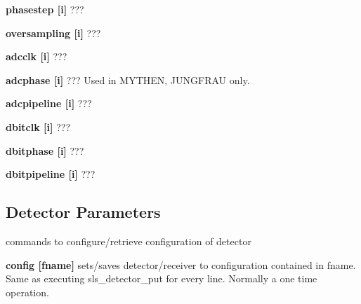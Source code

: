 \begin{DoxyItemize}
\item {\bfseries phasestep \mbox{[}i\mbox{]}} ???
\end{DoxyItemize}


\begin{DoxyItemize}
\item {\bfseries oversampling \mbox{[}i\mbox{]}} ???
\end{DoxyItemize}


\begin{DoxyItemize}
\item {\bfseries adcclk \mbox{[}i\mbox{]}} ???
\end{DoxyItemize}


\begin{DoxyItemize}
\item {\bfseries adcphase \mbox{[}i\mbox{]}} ??? Used in MYTHEN, JUNGFRAU only.
\end{DoxyItemize}


\begin{DoxyItemize}
\item {\bfseries adcpipeline \mbox{[}i\mbox{]}} ???
\end{DoxyItemize}


\begin{DoxyItemize}
\item {\bfseries dbitclk \mbox{[}i\mbox{]}} ???
\end{DoxyItemize}


\begin{DoxyItemize}
\item {\bfseries dbitphase \mbox{[}i\mbox{]}} ???
\end{DoxyItemize}


\begin{DoxyItemize}
\item {\bfseries dbitpipeline \mbox{[}i\mbox{]}} ???
\end{DoxyItemize}\hypertarget{config_configsettings}{}\subsection{Detector Parameters}\label{config_configsettings}
commands to configure/retrieve configuration of detector


\begin{DoxyItemize}
\item {\bfseries config \mbox{[}fname\mbox{]}} sets/saves detector/receiver to configuration contained in fname. Same as executing sls\_\-detector\_\-put for every line. Normally a one time operation.
\end{DoxyItemize}


